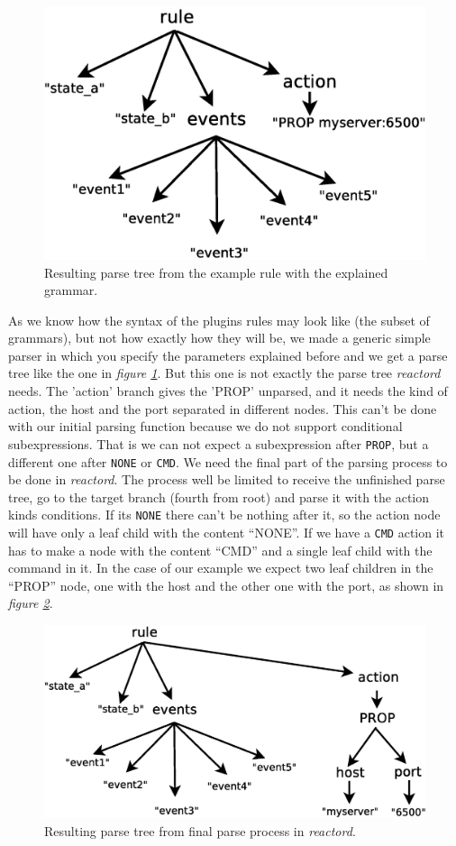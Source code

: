 \begin{figure}[t]
  \centering
  \includegraphics[width=.65\textwidth,keepaspectratio]{img/initparsetree}
  \caption{Resulting parse tree from the example rule with the explained grammar.}
  \label{fig:initparsetree}
\end{figure}
As we know how the syntax of the plugins rules may look like (the subset of grammars), but not how exactly how they will be, we made a 
generic simple parser in which you specify the parameters explained before and we get a parse tree like the one in \emph{figure 
\ref{fig:initparsetree}}. But this one is not exactly the parse tree \emph{reactord} needs. The 'action' branch gives the 'PROP' unparsed,
and it needs the kind of action, the host and the port separated in different nodes. This can't be done with our initial parsing function
because we do not support conditional subexpressions. That is we can not expect a subexpression after \texttt{PROP}, but a different
one after \texttt{NONE} or \texttt{CMD}. We need the final part of the parsing process to be done in \emph{reactord}. The process well be
limited to receive the unfinished parse tree, go to the target branch (fourth from root) and parse it with the action kinds conditions.
If its \texttt{NONE} there can't be nothing after it, so the action node will have only a leaf child with the content ``NONE''. If we 
have a \texttt{CMD} action it has to make a node with the content ``CMD'' and a single leaf child with the command in it. In the case of 
our example we expect two leaf children in the ``PROP'' node, one with the host and the other one with the port, as shown in \emph{figure
\ref{fig:finalparsetree}}.
\begin{figure}[t]
  \centering
  \includegraphics[width=.8\textwidth,keepaspectratio]{img/finalparsetree}
  \caption{Resulting parse tree from final parse process in \emph{reactord}.}
  \label{fig:finalparsetree}
\end{figure}
